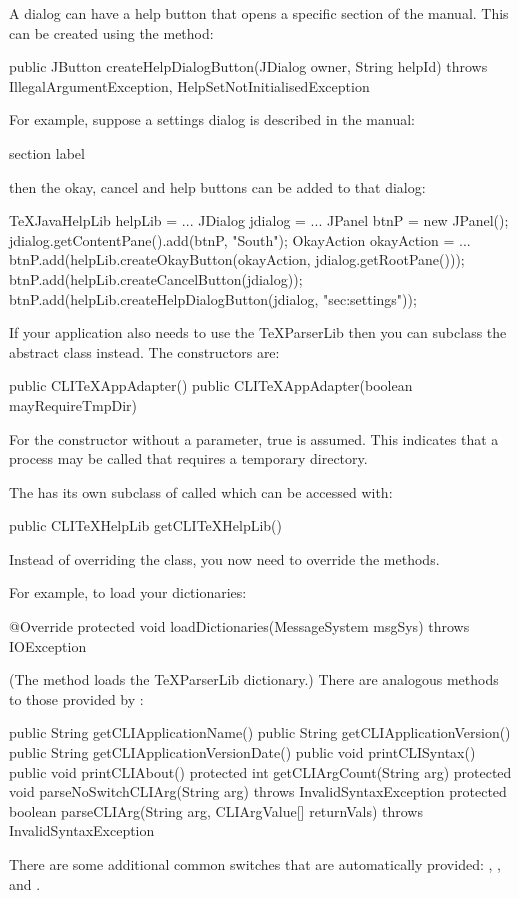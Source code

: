 \documentclass[toc=listof]{scrreport}
\begin{document}
A dialog can have a help button that opens a specific section of the
manual.  This can be created using the  method:
\begin{codebox}
public JButton createHelpDialogButton(JDialog owner, String helpId)
 throws IllegalArgumentException,
        HelpSetNotInitialisedException
\end{codebox}
For example, suppose a settings dialog is described in the
manual:
\begin{codebox}
\gls{section}
\gls{label}
\end{codebox}
then the okay, cancel and help buttons can be added to that dialog:
\begin{codebox}
TeXJavaHelpLib helpLib = ...
JDialog jdialog = ...
JPanel btnP = new JPanel();
jdialog.getContentPane().add(btnP, "South");
\codepar
OkayAction okayAction = ...
btnP.add(helpLib.createOkayButton(okayAction, jdialog.getRootPane()));
btnP.add(helpLib.createCancelButton(jdialog));
btnP.add(helpLib.createHelpDialogButton(jdialog, "sec:settings"));
\end{codebox}

If your application also needs to use the \gls{TeXParserLib} then
you can subclass the  abstract class instead.
The constructors are:
\begin{codebox}
public CLITeXAppAdapter()
public CLITeXAppAdapter(boolean mayRequireTmpDir)
\end{codebox}
For the constructor without a parameter, true is assumed.
This indicates that a process may be called that requires a
temporary directory.

The  has its own subclass of  called
 which can be accessed with:
\begin{codebox}
public CLITeXHelpLib getCLITeXHelpLib()
\end{codebox}
Instead of overriding the  class, you now need
to override the  methods.

For example, to load your dictionaries:
\begin{codebox}
@Override
protected void loadDictionaries(MessageSystem msgSys)
throws IOException
\end{codebox}
(The  method loads
the \gls{TeXParserLib} dictionary.)
There are analogous methods to those provided by :
\begin{codebox}
public String getCLIApplicationName()
public String getCLIApplicationVersion()
public String getCLIApplicationVersionDate()
public void printCLISyntax()
public void printCLIAbout()
protected int getCLIArgCount(String arg)
protected void parseNoSwitchCLIArg(String arg)
  throws InvalidSyntaxException
protected boolean parseCLIArg(String arg, CLIArgValue[] returnVals)
  throws InvalidSyntaxException
\end{codebox}
There are some additional common switches that are automatically
provided: , ,  and .
\end{document}

